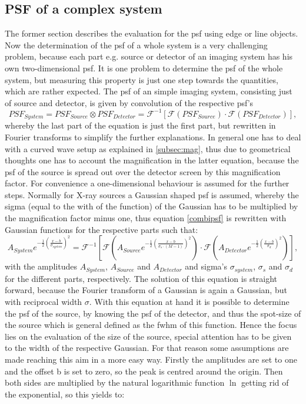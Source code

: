 \subsection{PSF of a complex system} \label{subsec:complpsf}
The former section describes the evaluation for the \acrfull{psf} using edge or line objects. Now the determination of the \gls{psf} of a whole system is a very challenging problem, because each part e.g. source or detector of an imaging system has his own two-dimensional \gls{psf}. It is one problem to determine the \acrfull{psf} of the whole system, but measuring this property is just one step towards the quantities, which are rather expected. The \gls{psf} of an simple imaging system, consisting just of source and detector, is given by convolution of the respective \gls{psf}'s
\begin{equation}\label{combipsf} 
PSF_{System} = PSF_{Source} \otimes PSF_{Detector} = \mathcal{F^{-1}}[\mathcal{F}(PSF_{Source})\cdot \mathcal{F}(PSF_{Detector})],
\end{equation}
whereby the last part of the equation is just the first part, but rewritten in Fourier transforms to simplify the further explanations. In general one has to deal with a curved wave setup as explained in \ref{subsec:mag}, thus due to geometrical thoughts one has to account the magnification in the latter equation, because the \gls{psf} of the source is spread out over the detector screen by this magnification factor. For convenience a one-dimensional behaviour is assumed for the further steps. Normally for X-ray sources a Gaussian shaped \gls{psf} is assumed, whereby the sigma (equal to the with of the function) of the Gaussian has to be multiplied by the magnification factor minus one, thus equation \ref{combipsf} is rewritten with Gaussian functions for the respective parts such that:
\begin{equation}
A_{System}e^{-\frac{1}{2}(\frac{x -b}{\sigma_{system}})^{2}} = \mathcal{F^{-1}}[\mathcal{F}(A_{Source}e^{-\frac{1}{2}(\frac{x -b}{\sigma_{s}\cdot(M-1)})^{2}})
\cdot \mathcal{F}(A_{Detector}e^{-\frac{1}{2}(\frac{x -b}{\sigma_{d}})^{2}})],
\end{equation}
with the amplitudes $A_{System}$, $A_{Source}$ and $A_{Detector}$ and sigma's $\sigma_{system}$, $\sigma_{s}$ and $\sigma_{d}$ for the different parts, respectively. The solution of this equation is straight forward, because the Fourier transform of a Gaussian is again a Gaussian, but with reciprocal width $\sigma$. With this equation at hand it is possible to determine the \gls{psf} of the source, by knowing the \gls{psf} of the detector, and thus the spot-size of the source which is general defined as the \gls{fwhm} of this function. Hence the focus lies on the evaluation of the size of the source, special attention has to be given to the width of the respective Gaussian. For that reason some assumptions are made reaching this aim in a more easy way. Firstly the amplitudes are set to one and the offset b is set to zero, so the peak is centred around the origin. Then both sides are multiplied by the natural logarithmic function $\ln$ getting rid of the exponential, so this yields to:
